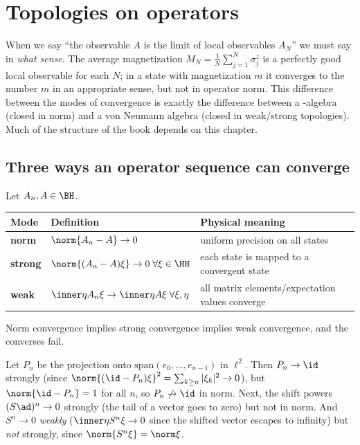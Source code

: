 \chapter{Topologies on operators}\label{ch:topologies}

\begin{physmotiv}
When we say ``the observable $A$ is the limit of local observables $A_N$'' we must say in \emph{what sense}. The average magnetization $M_N=\frac1N\sum_{j=1}^N\sigma^z_j$ is a perfectly good local observable for each $N$; in a state with magnetization $m$ it converges to the number $m$ in an appropriate sense, but not in operator norm. This difference between the modes of convergence is exactly the difference between a \cstar-algebra (closed in norm) and a von Neumann algebra (closed in weak/strong topologies). Much of the structure of the book depends on this chapter.
\end{physmotiv}

\section{Three ways an operator sequence can converge}

Let $A_n,A\in\BH$.
\begin{center}
\renewcommand{\arraystretch}{1.3}
\begin{tabular}{@{}lll@{}}
\toprule
Mode & Definition & Physical meaning\\
\midrule
\textbf{norm} & $\norm{A_n-A}\to0$ & uniform precision on all states\\
\textbf{strong} & $\norm{(A_n-A)\xi}\to0\;\forall\xi\in\HH$ & each state is mapped to a convergent state\\
\textbf{weak} & $\inner\eta{A_n\xi}\to\inner\eta{A\xi}\;\forall\xi,\eta$ & all matrix elements/expectation values converge\\
\bottomrule
\end{tabular}
\end{center}
Norm convergence implies strong convergence implies weak convergence, and the converses fail.

\begin{example}\label{ex:shift}
Let $P_n$ be the projection onto $\mathrm{span}(e_0,\dots,e_{n-1})$ in $\ell^2$. Then $P_n\to\id$ strongly (since $\norm{(\id-P_n)\xi}^2=\sum_{k\ge n}|\xi_k|^2\to0$), but $\norm{\id-P_n}=1$ for all $n$, so $P_n\not\to\id$ in norm. Next, the shift powers $(S\ad)^n\to0$ strongly (the tail of a vector goes to zero) but not in norm. And $S^n\to0$ \emph{weakly} ($\inner\eta{S^n\xi}\to0$ since the shifted vector escapes to infinity) but \emph{not} strongly, since $\norm{S^n\xi}=\norm\xi$.
\end{example}

